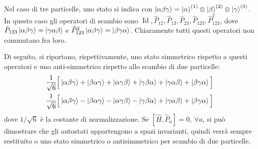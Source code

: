 \documentclass[11pt, a4paper]{scrartcl} %
\numberwithin{equation}{subsection}
\theoremstyle{style2}
\theoremstyle{style1}
\begin{document}
Nel caso di tre particelle, uno stato si indica con $\ket{\alpha \beta \gamma} = \ket{\alpha } ^{(1)} \otimes \ket{\beta } ^{(2)} \otimes \ket{\gamma} ^{(3)} $.
In questo caso gli operatori di scambio sono $\operatorname{Id}, \hat{P}_{12}, \hat{P}_{13} , \hat{P}_{23} , \hat{P}_{123} , \hat{P}_{123} ^2$, dove $\hat{P}_{123} \ket{\alpha \beta \gamma} = \ket{\gamma \alpha  \beta } $ e $\hat{P}_{123} ^2 \ket{\alpha  \beta \gamma} = \ket{\beta \gamma\alpha } $.
Chiaramente tutti questi operatori non commutano fra loro.

Di seguito, si riportano, rispettivamente, uno stato simmetrico rispetto a questi operatori e uno anti-simmetrico rispetto allo scambio di due particelle:
\[
\begin{split}
	& \frac{1}{\sqrt{6} } \Big[\ket{\alpha \beta \gamma} + \ket{\beta \alpha \gamma} +\ket{\alpha \gamma\beta } + \ket{\gamma\beta \alpha } +\ket{\gamma\alpha \beta } + \ket{\beta \gamma\alpha } \Big]\\
	&\frac{1}{\sqrt{6} } \Big[\ket{\alpha \beta \gamma} - \ket{\beta \alpha \gamma} - \ket{\alpha \gamma\beta } -\ket{\gamma\beta \alpha } + \ket{\gamma\alpha \beta } + \ket{\beta \gamma\alpha } \Big]
\end{split}
\] 
dove $1 / \sqrt{6} $ \`e la costante di normalizzazione.
Se $[\hat{H},\hat{P}_a] = 0, \ \forall a$, si pu\`o dimostrare che gli autostati appartengono a spazi invarianti, quindi verr\`a sempre restituito o uno stato simmetrico o antisimmetrico per scambio di due particelle.
\end{document}
